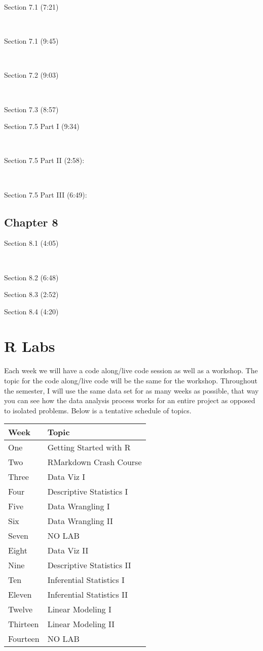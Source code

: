 \documentclass[
]{book}
\begin{document}
Section 7.1 (7:21)

~

Section 7.1 (9:45)

~

Section 7.2 (9:03)

~

Section 7.3 (8:57)

Section 7.5 Part I (9:34)

~

Section 7.5 Part II (2:58):

~

Section 7.5 Part III (6:49):

\hypertarget{chapter-8}{%
\section{Chapter 8}\label{chapter-8}}

Section 8.1 (4:05)

~

Section 8.2 (6:48)

Section 8.3 (2:52)

Section 8.4 (4:20)

\hypertarget{r-labs}{%
\chapter{R Labs}\label{r-labs}}

Each week we will have a code along/live code session as well as a workshop. The topic for the code along/live code will be the same for the workshop. Throughout the semester, I will use the same data set for as many weeks as possible, that way you can see how the data analysis process works for an entire project as opposed to isolated problems. Below is a tentative schedule of topics.

\begin{tabular}{l|l}
\hline
Week & Topic\\
\hline
One & Getting Started with R\\
\hline
Two & RMarkdown Crash Course\\
\hline
Three & Data Viz I\\
\hline
Four & Descriptive Statistics I\\
\hline
Five & Data Wrangling I\\
\hline
Six & Data Wrangling II\\
\hline
Seven & NO LAB\\
\hline
Eight & Data Viz II\\
\hline
Nine & Descriptive Statistics II\\
\hline
Ten & Inferential Statistics I\\
\hline
Eleven & Inferential Statistics II\\
\hline
Twelve & Linear Modeling I\\
\hline
Thirteen & Linear Modeling II\\
\hline
Fourteen & NO LAB\\
\hline
\end{tabular}
\end{document}
